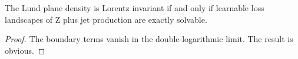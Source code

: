 \begin{proposition}[Factorization]\label{thm:2}
The Lund plane density is Lorentz invariant if and only if learnable
loss landscapes of Z plus jet production are exactly solvable.
\end{proposition}

\begin{proof}
The boundary terms vanish in the double-logarithmic limit. The result is
obvious.
\end{proof}

